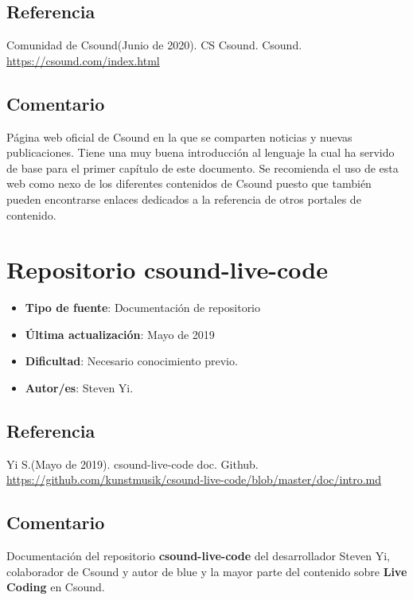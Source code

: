 \subsection{Referencia}

Comunidad de Csound(Junio de 2020). CS Csound. Csound. \url{https://csound.com/index.html}

\subsection{Comentario}

Página web oficial de Csound en la que se comparten noticias y nuevas publicaciones. Tiene una muy buena introducción al lenguaje la cual ha servido de base para el primer capítulo de este documento. Se recomienda el uso de esta web como nexo de los diferentes contenidos de Csound puesto que también pueden encontrarse enlaces dedicados a la referencia de otros portales de contenido.

\section{Repositorio csound-live-code}

 \begin{itemize}
 \item \textbf{Tipo de fuente}: Documentación de repositorio
 
 \item \textbf{Última actualización}: Mayo de 2019
 
 \item \textbf{Dificultad}: Necesario conocimiento previo.
 
 \item \textbf{Autor/es}: Steven Yi.
 \end{itemize}

\subsection{Referencia}

Yi S.(Mayo de 2019). csound-live-code doc. Github. \url{https://github.com/kunstmusik/csound-live-code/blob/master/doc/intro.md}

\subsection{Comentario}

Documentación del repositorio \textbf{csound-live-code} del desarrollador Steven Yi, colaborador de Csound y autor de blue y la mayor parte del contenido sobre \textbf{Live Coding} en Csound.

